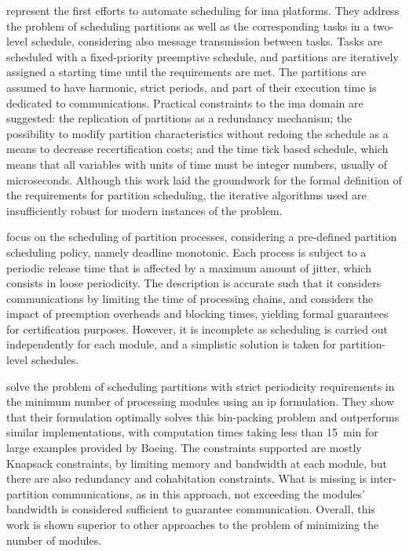 \documentclass[main.tex]{subfiles}
\begin{document}
\Textcite{lee2000scheduling} represent the first efforts to automate scheduling for \gls{ima} platforms.
They address the problem of scheduling partitions as well as the corresponding tasks in a two-level schedule, considering also message transmission between tasks.
Tasks are scheduled with a fixed-priority preemptive schedule, and partitions are iteratively assigned a starting time until the requirements are met.
The partitions are assumed to have harmonic, strict periods, and part of their execution time is dedicated to communications. 
Practical constraints to the \gls{ima} domain are suggested: the replication of partitions as a redundancy mechanism; the possibility to modify partition characteristics without redoing the schedule as a means to decrease recertification costs; and the time tick based schedule, which means that all variables with units of time must be integer numbers, usually of microseconds.
Although this work laid the groundwork for the formal definition of the requirements for partition scheduling, the iterative algorithms used are insufficiently robust for modern instances of the problem.

\Textcite{easwaran2009compositional} focus on the scheduling of partition processes, considering a pre-defined partition scheduling policy, namely deadline monotonic.
Each process is subject to a periodic release time that is affected by a maximum amount of jitter, which consists in loose periodicity.
The description is accurate such that it considers communications by limiting the time of processing chains, and considers the impact of preemption overheads and blocking times, yielding formal guarantees for certification purposes.
However, it is incomplete as scheduling is carried out independently for each module, and a simplistic solution is taken for partition-level schedules.

\Textcite{eisenbrand2010solving} solve the problem of scheduling partitions with strict periodicity requirements in the minimum number of processing modules using an \gls{ip} formulation.
They show that their formulation optimally solves this bin-packing problem and outperforms similar implementations, with computation times taking less than \SI{15}{\minute} for large examples provided by Boeing.
The constraints supported are mostly Knapsack constraints, by limiting memory and bandwidth at each module, but there are also redundancy and cohabitation constraints. 
What is missing is inter-partition communications, as in this approach, not exceeding the modules' bandwidth is considered sufficient to guarantee communication.
Overall, this work is shown superior to other approaches to the problem of minimizing the number of modules.
\end{document}
